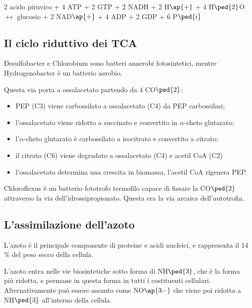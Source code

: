 \documentclass[11pt]{book}
\begin{document}
2 acido piruvico + 4 ATP + 2 GTP + 2 NADH + 2 H$\ap{+}$ + 4 H$\ped{2}$O $\longleftrightarrow$ glucosio + 2 NAD$\ap{+}$ + 4 ADP + 2 GDP + 6 P$\ped{i}$

\subsection{Il ciclo riduttivo dei TCA} 
Desulfobacter e Chlorobium sono  batteri anaerobi fotosintetici, mentre Hydrogenobacter è un batterio aerobio. 

\vspace{1em}
Questa via porta a ossalacetato partendo da 4 CO$\ped{2}$:
\begin{itemize} 
\item PEP (C3) viene carbossilato a ossalacetato (C4) da PEP carbossilasi;
\item l'ossalacetato viene ridotto a succinato e convertito in $\alpha$-cheto glutarato;
\item l'$\alpha$-cheto glutarato è carbossilato a isocitrato e convertito a citrato;
\item il citrato (C6) viene degradato a ossalacetato (C4) e acetil CoA (C2) 
\item l'ossalacetato determina una crescita in biomassa, l'acetil CoA rigenera PEP.
\end{itemize}

Chloroflexus è un batterio fototrofo termofilo capace di fissare la CO$\ped{2}$ attraverso la via dell’idrossipropionato. 
Questa era la via arcaica dell'autotrofia. 

\subsection{L'assimilazione dell’azoto} 
L'azoto è il principale componente di proteine e acidi nucleici, e rappresenta il 14$\%$ del peso secco della cellula.

L'azoto entra nelle vie biosintetiche sotto forma di NH$\ped{3}$, che è la forma più ridotta, e permane in questa forma in tutti i costituenti cellulari. Alternativamente può essere assunto come NO$\ap{3-}$ che viene poi ridotto a NH$\ped{3}$ all’interno della cellula.
\end{document}
